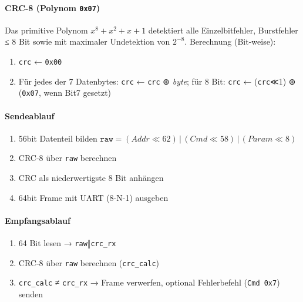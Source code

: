 \documentclass[main.tex]{subfiles} %
\begin{document}
\paragraph{CRC-8 (Polynom \texttt{0x07})}
Das primitive Polynom
\(x^{8}\!+\!x^{2}\!+\!x\!+\!1\)
detektiert alle Einzelbitfehler, Burstfehler ≤ 8 Bit sowie mit
maximaler Undetektion von \(2^{-8}\).
Berechnung (Bit-weise):

\begin{enumerate}\setlength\itemsep{0.25em}
  \item \texttt{crc} ← \texttt{0x00}
  \item Für jedes der 7 Datenbytes:
    \texttt{crc} ← \texttt{crc} ⊕ \textit{byte};
    für 8 Bit:
    \texttt{crc} ← (\texttt{crc}≪1) ⊕ (\texttt{0x07}, wenn Bit7 gesetzt)
\end{enumerate}

\paragraph{Sendeablauf}
\begin{enumerate}\setlength\itemsep{0.25em}
  \item 56bit Datenteil bilden
    \(\texttt{raw}=(Addr\ll62)\,|\, (Cmd\ll58)\,|\, (Param\ll8)\)
  \item CRC-8 über \texttt{raw} berechnen
  \item CRC als niederwertigste 8 Bit anhängen
  \item 64bit Frame mit UART (8-N-1) ausgeben
\end{enumerate}

\paragraph{Empfangsablauf}
\begin{enumerate}\setlength\itemsep{0.25em}
  \item 64 Bit lesen → \texttt{raw}‖\texttt{crc\_rx}
  \item CRC-8 über \texttt{raw} berechnen (\texttt{crc\_calc})
  \item \texttt{crc\_calc} ≠ \texttt{crc\_rx} → Frame verwerfen, optional
    Fehlerbefehl (\texttt{Cmd 0x7}) senden
\end{enumerate}

\end{document}
